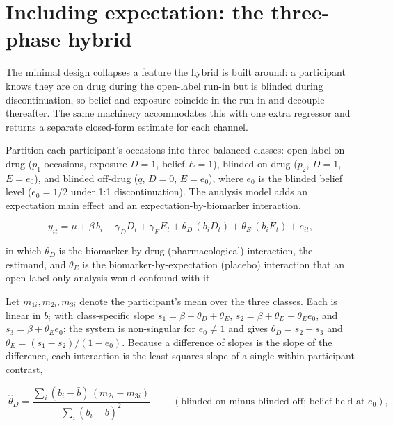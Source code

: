 \documentclass[
  11pt,
]{article}
\begin{document}
\section{Including expectation: the three-phase hybrid}\label{including-expectation-the-three-phase-hybrid}

The minimal design collapses a feature the hybrid is built around: a
participant knows they are on drug during the open-label run-in but is
blinded during discontinuation, so belief and exposure coincide in the
run-in and decouple thereafter. The same machinery accommodates this
with one extra regressor and returns a separate closed-form estimate
for each channel.

Partition each participant's occasions into three balanced classes:
open-label on-drug (\(p_1\) occasions, exposure \(D = 1\), belief
\(E = 1\)), blinded on-drug (\(p_2\), \(D = 1\), \(E = e_0\)), and blinded
off-drug (\(q\), \(D = 0\), \(E = e_0\)), where \(e_0\) is the blinded belief
level (\(e_0 = 1/2\) under 1:1 discontinuation). The analysis model adds
an expectation main effect and an expectation-by-biomarker
interaction,

\begin{equation}
y_{it} = \mu + \beta\, b_i + \gamma_D D_t + \gamma_E E_t
       + \theta_D\,(b_i D_t) + \theta_E\,(b_i E_t) + e_{it},
\label{eq:model-exp}
\end{equation}

in which \(\theta_D\) is the biomarker-by-drug (pharmacological)
interaction, the estimand, and \(\theta_E\) is the
biomarker-by-expectation (placebo) interaction that an
open-label-only analysis would confound with it.

Let \(m_{1i}, m_{2i}, m_{3i}\) denote the participant's mean over the
three classes. Each is linear in \(b_i\) with class-specific slope
\(s_1 = \beta + \theta_D + \theta_E\),
\(s_2 = \beta + \theta_D + \theta_E e_0\), and
\(s_3 = \beta + \theta_E e_0\); the system is non-singular for
\(e_0 \neq 1\) and gives \(\theta_D = s_2 - s_3\) and
\(\theta_E = (s_1 - s_2)/(1 - e_0)\). Because a difference of slopes is
the slope of the difference, each interaction is the least-squares
slope of a single within-participant contrast,

\begin{equation}
\boxed{\;\hat\theta_D
  = \frac{\sum_i (b_i - \bar b)\,(m_{2i} - m_{3i})}
         {\sum_i (b_i - \bar b)^2}\;}
\qquad (\text{blinded-on minus blinded-off; belief held at } e_0),
\label{eq:thetaD}
\end{equation}
\end{document}

